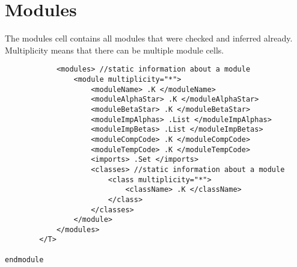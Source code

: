 \section{Modules}

The modules cell contains all modules that were checked and inferred already. Multiplicity means that there can be multiple module cells.

\begin{lstlisting}
            <modules> //static information about a module
                <module multiplicity="*">
                    <moduleName> .K </moduleName>
                    <moduleAlphaStar> .K </moduleAlphaStar>
                    <moduleBetaStar> .K </moduleBetaStar>
                    <moduleImpAlphas> .List </moduleImpAlphas>
                    <moduleImpBetas> .List </moduleImpBetas>
                    <moduleCompCode> .K </moduleCompCode>
                    <moduleTempCode> .K </moduleTempCode>
                    <imports> .Set </imports>
                    <classes> //static information about a module
                        <class multiplicity="*">
                            <className> .K </className>
                        </class>
                    </classes>
                </module>
            </modules>
        </T>

endmodule
\end{lstlisting}